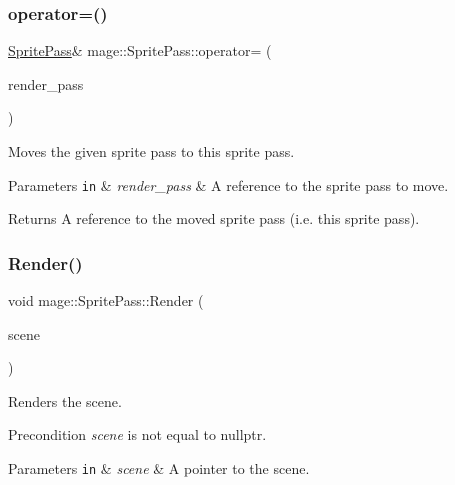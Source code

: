 \subsubsection{\texorpdfstring{operator=()}{operator=()}\hspace{0.1cm}{\footnotesize\ttfamily [2/2]}}
{\footnotesize\ttfamily \hyperlink{classmage_1_1_sprite_pass}{Sprite\+Pass}\& mage\+::\+Sprite\+Pass\+::operator= (\begin{DoxyParamCaption}\item[{\hyperlink{classmage_1_1_sprite_pass}{Sprite\+Pass} \&\&}]{render\+\_\+pass }\end{DoxyParamCaption})\hspace{0.3cm}{\ttfamily [delete]}}

Moves the given sprite pass to this sprite pass.


\begin{DoxyParams}[1]{Parameters}
\mbox{\tt in}  & {\em render\+\_\+pass} & A reference to the sprite pass to move. \\
\hline
\end{DoxyParams}
\begin{DoxyReturn}{Returns}
A reference to the moved sprite pass (i.\+e. this sprite pass). 
\end{DoxyReturn}
\hypertarget{classmage_1_1_sprite_pass_ad617d46a3edbf5ee533f4d20e3d69ae2}{}\label{classmage_1_1_sprite_pass_ad617d46a3edbf5ee533f4d20e3d69ae2} 
\subsubsection{\texorpdfstring{Render()}{Render()}}
{\footnotesize\ttfamily void mage\+::\+Sprite\+Pass\+::\+Render (\begin{DoxyParamCaption}\item[{const \hyperlink{structmage_1_1_pass_buffer}{Pass\+Buffer} $\ast$}]{scene }\end{DoxyParamCaption})}

Renders the scene.

\begin{DoxyPrecond}{Precondition}
{\itshape scene} is not equal to {\ttfamily nullptr}. 
\end{DoxyPrecond}

\begin{DoxyParams}[1]{Parameters}
\mbox{\tt in}  & {\em scene} & A pointer to the scene. \\
\hline
\end{DoxyParams}

